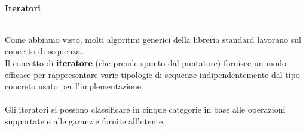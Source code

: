 \documentclass{article}
\begin{document}
\\ 
\begin{large}\textbf{\textcolor{blu}{Iteratori}} \\ \\ \end{large}
Come abbiamo visto, molti algoritmi generici della libreria standard lavorano sul concetto di sequenza.\\
Il concetto di \textbf{iteratore} (che prende spunto dal puntatore) fornisce un modo efficace per rappresentare varie tipologie di sequenze indipendentemente dal tipo concreto usato per l'implementazione.\\ \\Gli iteratori si possono classificare in cinque categorie in base alle operazioni supportate e alle garanzie fornite all'utente. \\
\end{document}
